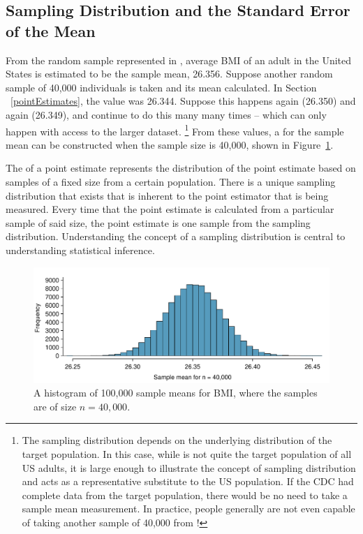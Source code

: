 \subsection{Sampling Distribution and the Standard Error of the Mean}
\label{seOfTheMean}

From the random sample represented in , average BMI of an adult in the United States is estimated to be the sample mean, 26.356. Suppose another random sample of 40,000 individuals is taken and its mean calculated. In Section ~\ref{pointEstimates}, the value was 26.344. Suppose this happens again (26.350) and again (26.349), and continue to do this many many times -- which can only happen with access to the larger  dataset. \footnote{The sampling distribution depends on the underlying distribution of the target population. In this case, while  is not quite the target population of all US adults, it is large enough to illustrate the concept of sampling distribution and acts as a representative substitute to the US population. If the CDC had complete data from the target population, there would be no need to take a sample mean measurement. In practice, people generally are not even capable of taking another sample of 40,000 from !} From these values, a  for the sample mean can be constructed when the sample size is 40,000, shown in Figure~\ref{brfssBMISamplingDistribution}.

\begin{termBox}{
The  of a point estimate represents the distribution of the point estimate based on samples of a fixed size from a certain population. There is a unique sampling distribution that exists that is inherent to the point estimator that is being measured. Every time that the point estimate is calculated from a particular sample of said size, the point estimate is one sample from the sampling distribution. Understanding the concept of a sampling distribution is central to understanding statistical inference.}
\end{termBox}

\begin{figure}
   \centering
   \includegraphics[width=\textwidth]{ch_inference_foundations_oi_biostat/figures/brfssBMISamplingDistribution/brfssBMISamplingDistribution}
   \caption{A histogram of 100,000 sample means for BMI, where the samples are of size $n=40,000$. }
      \label{brfssBMISamplingDistribution}
\end{figure}


